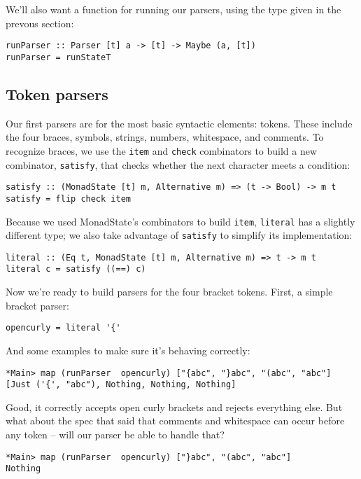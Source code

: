 \documentclass{tmr}
\begin{document}
We'll also want a function for running our parsers, using the type given in the
prevous section:
\begin{verbatim}
runParser :: Parser [t] a -> [t] -> Maybe (a, [t])
runParser = runStateT
\end{verbatim}

\subsection{Token parsers}
Our first parsers are for the most basic syntactic elements:  tokens.
These include the four braces, symbols, strings, numbers, whitespace, and comments.
To recognize braces, we use the \verb+item+ and \verb+check+ 
combinators to build a new combinator, \verb+satisfy+, that checks whether 
the next character meets a condition:
\begin{verbatim}
satisfy :: (MonadState [t] m, Alternative m) => (t -> Bool) -> m t
satisfy = flip check item
\end{verbatim}

Because we used MonadState's combinators to build \verb+item+, \verb+literal+ 
has a slightly different type; we also take advantage of \verb+satisfy+ to 
simplify its implementation:
\begin{verbatim}
literal :: (Eq t, MonadState [t] m, Alternative m) => t -> m t
literal c = satisfy ((==) c)
\end{verbatim}

Now we're ready to build parsers for the four bracket tokens.  
First, a simple bracket parser:
\begin{verbatim}
opencurly = literal '{'
\end{verbatim}

And some examples to make sure it's behaving correctly: 
\begin{verbatim}
*Main> map (runParser  opencurly) ["{abc", "}abc", "(abc", "abc"]
[Just ('{', "abc"), Nothing, Nothing, Nothing]
\end{verbatim}

Good, it correctly accepts open curly brackets and rejects everything else.
But what about the spec that said that comments and whitespace can occur 
before any token -- will our parser be able to handle that?
\begin{verbatim}
*Main> map (runParser  opencurly) ["}abc", "(abc", "abc"]
Nothing
\end{verbatim}
\end{document}
